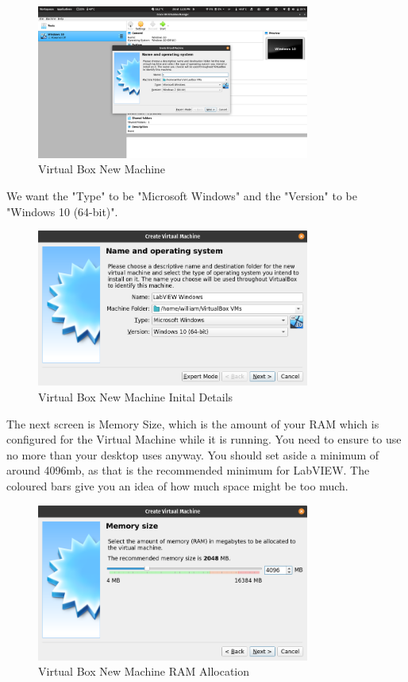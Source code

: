 \documentclass[a4paper,11pt]{report}
\begin{document}
\begin{figure}[H]
\centering
\includegraphics[width=0.8\textwidth]{screenshots/virtualboxsetup}
\caption{Virtual Box New Machine}
\end{figure}

We want the "Type" to be "Microsoft Windows" and the "Version" to be "Windows 10 (64-bit)".

\begin{figure}[H]
\centering
\includegraphics[width=0.8\textwidth]{screenshots/virtualboxsetupfilled}
\caption{Virtual Box New Machine Inital Details}
\end{figure}

The next screen is Memory Size, which is the amount of your RAM which is configured for the Virtual Machine while it is running. You need to ensure to use no more than your desktop uses anyway. You should set aside a minimum of around 4096mb, as that is the recommended minimum for LabVIEW. The coloured bars give you an idea of how much space might be too much.

\begin{figure}[H]
\centering
\includegraphics[width=0.8\textwidth]{screenshots/virtualboxram}
\caption{Virtual Box New Machine RAM Allocation}
\end{figure}
\end{document}
